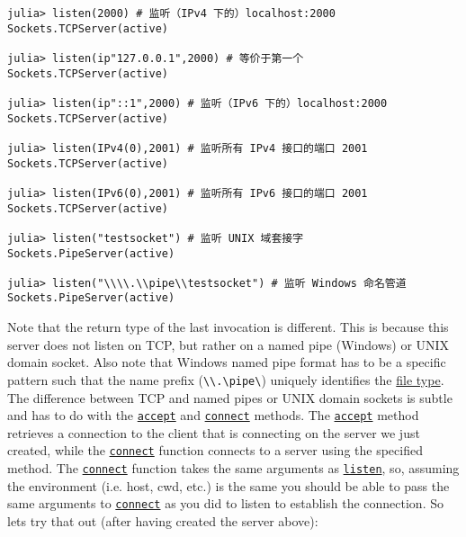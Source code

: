 \begin{verbatim}
julia> listen(2000) # 监听（IPv4 下的）localhost:2000
Sockets.TCPServer(active)

julia> listen(ip"127.0.0.1",2000) # 等价于第一个
Sockets.TCPServer(active)

julia> listen(ip"::1",2000) # 监听（IPv6 下的）localhost:2000
Sockets.TCPServer(active)

julia> listen(IPv4(0),2001) # 监听所有 IPv4 接口的端口 2001
Sockets.TCPServer(active)

julia> listen(IPv6(0),2001) # 监听所有 IPv6 接口的端口 2001
Sockets.TCPServer(active)

julia> listen("testsocket") # 监听 UNIX 域套接字
Sockets.PipeServer(active)

julia> listen("\\\\.\\pipe\\testsocket") # 监听 Windows 命名管道
Sockets.PipeServer(active)
\end{verbatim}



Note that the return type of the last invocation is different. This is because this server does not listen on TCP, but rather on a named pipe (Windows) or UNIX domain socket. Also note that Windows named pipe format has to be a specific pattern such that the name prefix (\texttt{{\textbackslash}{\textbackslash}.{\textbackslash}pipe{\textbackslash}}) uniquely identifies the \href{https://docs.microsoft.com/windows/desktop/ipc/pipe-names}{file type}. The difference between TCP and named pipes or UNIX domain sockets is subtle and has to do with the \hyperlink{1426793569216032849}{\texttt{accept}} and \hyperlink{9743233285520657275}{\texttt{connect}} methods. The \hyperlink{1426793569216032849}{\texttt{accept}} method retrieves a connection to the client that is connecting on the server we just created, while the \hyperlink{9743233285520657275}{\texttt{connect}} function connects to a server using the specified method. The \hyperlink{9743233285520657275}{\texttt{connect}} function takes the same arguments as \hyperlink{780704944207038170}{\texttt{listen}}, so, assuming the environment (i.e. host, cwd, etc.) is the same you should be able to pass the same arguments to \hyperlink{9743233285520657275}{\texttt{connect}} as you did to listen to establish the connection. So let{\textquotesingle}s try that out (after having created the server above):




